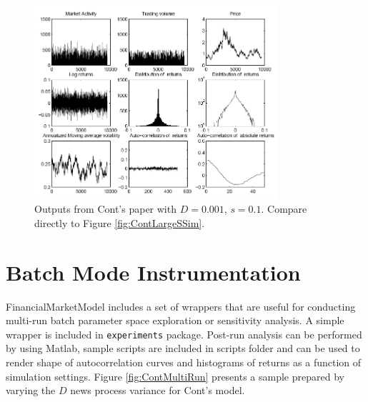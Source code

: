 \documentclass[runningheads]{llncs}
\begin{document}
\begin{figure}[htbp]
  \begin{center}
    \includegraphics[width=0.8\textwidth]{../graphics/Cont-Fig4.png}
    \caption{Outputs from Cont's paper with $D=0.001$, $s=0.1$. Compare directly to Figure \ref{fig:ContLargeSSim}.}
    \label{fig:ContLargeSPap}
  \end{center}
\end{figure}

\section{Batch Mode Instrumentation}

FinancialMarketModel includes a set of wrappers that are useful for conducting multi-run batch parameter space exploration or sensitivity analysis. A simple wrapper is included in \texttt{experiments} package. Post-run analysis can be performed by using Matlab, sample scripts are included in scripts folder and can be used to render shape of autocorrelation curves and histograms of returns as a function of simulation settings. Figure \ref{fig:ContMultiRun} presents a sample prepared by varying the $D$ news process variance for Cont's model.    
\end{document}

